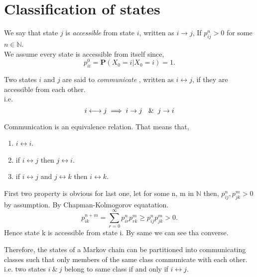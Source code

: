 \section{Classification of states}
\begin{definition}[]
    We say that state $j$ is \textit{accessible} from state $i$, written as $ i \to j $, If  $ p^{n}_{ij}>0 $ for some $ n\in\mathds{N} $.\\ 
    We assume every state is accessible from itself since,
    \[
        p^{0}_{ii} = \mathbf{P}(X_{0}=i|X_{0}=i) = 1.
    \]
\end{definition}

\begin{definition}[]
    Two states $i$ and $j$ are said to \textit{communicate} , written as $ i \longleftrightarrow j $, if they are accessible from each other.\\ 
    i.e.
    \[
        i\longleftrightarrow j \implies i \to j \ \And j\to i
    \]
\end{definition}

Communication is an equivalence relation. That means that,
\begin{enumerate}
    \item $ i\longleftrightarrow i $.
    \item if $ i\longleftrightarrow j $ then  $ j\longleftrightarrow i$.
    \item if  $ i\longleftrightarrow j $ and  $ j\longleftrightarrow k $ then  $ i\longleftrightarrow k $.
\end{enumerate}

First two property is obvious for last one, let for some n, m in $ \mathds{N} $ then, $ p^{n}_{ij},p^{m}_{jk}>0 $ by assumption.
By Chapman-Kolmogorov equatation.
\[
    p^{n+m}_{ik} = \sum_{r=0}^{\infty} p^{n}_{ir}p^{m}_{rk} \ge p^{n}_{ij}p^{m}_{jk}>0.
\]
Hence state k is accessible from state i. By same we can see tha converse.

Therefore, the states of a Markov chain can be partitioned into communicating classes such that 
only members of the same class communicate with each other. 
i.e. two states $ i \ \&\ j $ belong to same class if and only if $ i\longleftrightarrow j $.

